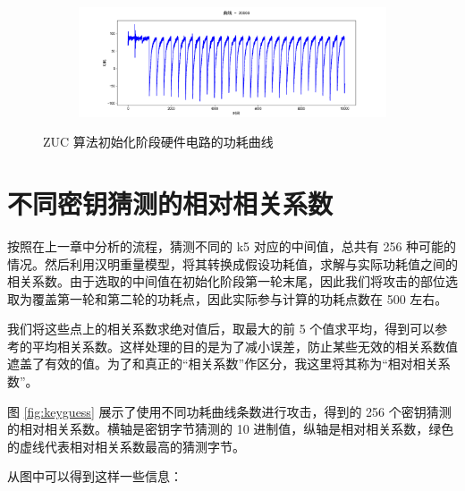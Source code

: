 \begin{figure}[htbp]
\begin{subfigure}{1.0\textwidth}
    \end{subfigure}
    \begin{subfigure}{1.0\textwidth}
        \includegraphics[height=.17\textheight, width=1.0\textwidth]{../images/trace_20000.png}
    \end{subfigure}

    \caption{ZUC 算法初始化阶段硬件电路的功耗曲线}

    \label{fig:traces}

\end{figure}

\newpage

\section{不同密钥猜测的相对相关系数}

按照在上一章中分析的流程，猜测不同的 k5 对应的中间值，总共有 256 种可能的情况。然后利用汉明重量模型，将其转换成假设功耗值，求解与实际功耗值之间的相关系数。由于选取的中间值在初始化阶段第一轮末尾，因此我们将攻击的部位选取为覆盖第一轮和第二轮的功耗点，因此实际参与计算的功耗点数在 500 左右。

我们将这些点上的相关系数求绝对值后，取最大的前 5 个值求平均，得到可以参考的平均相关系数。这样处理的目的是为了减小误差，防止某些无效的相关系数值遮盖了有效的值。为了和真正的“相关系数”作区分，我这里将其称为“相对相关系数”。

\vspace*{\baselineskip}

图 \ref{fig:keyguess} 展示了使用不同功耗曲线条数进行攻击，得到的 256 个密钥猜测的相对相关系数。横轴是密钥字节猜测的 10 进制值，纵轴是相对相关系数，绿色的虚线代表相对相关系数最高的猜测字节。

从图中可以得到这样一些信息：

